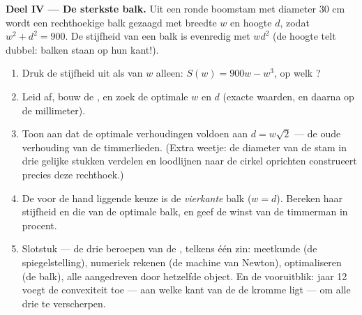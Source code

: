 \begin{problem}
\medskip
\noindent\textbf{Deel IV --- De sterkste balk.}
Uit een ronde boomstam met diameter $30$ cm wordt een rechthoekige balk
gezaagd met breedte $w$ en hoogte $d$, zodat $w^2 + d^2 = 900$. De stijfheid
van een balk is evenredig met $w d^2$ (de hoogte telt dubbel: balken staan op
hun kant!).
\begin{enumerate}[resume]
  \item Druk de stijfheid uit als  van $w$ alleen:
        $S(w) = 900w - w^3$, op welk ?
  \item Leid af, bouw de , en zoek de optimale $w$ en $d$
        (exacte waarden, en daarna op de millimeter).
  \item Toon aan dat de optimale verhoudingen voldoen aan $d = w\sqrt2$ ---
        de oude verhouding van de timmerlieden. (Extra weetje: de diameter
        van de stam in drie gelijke stukken verdelen en loodlijnen naar de
        cirkel oprichten construeert precies deze rechthoek.)
  \item De voor de hand liggende keuze is de \emph{vierkante} balk
        ($w = d$). Bereken haar stijfheid en die van de optimale balk, en
        geef de winst van de timmerman in procent.
  \item Slotstuk --- de drie beroepen van de , telkens één zin:
        meetkunde (de spiegelstelling), numeriek rekenen (de machine van
        Newton), optimaliseren (de balk), alle aangedreven door hetzelfde
        object. En de vooruitblik: jaar 12 voegt de convexiteit toe --- aan
        welke kant van de  de kromme ligt --- om alle drie te
        verscherpen.
\end{enumerate}
\end{problem}
